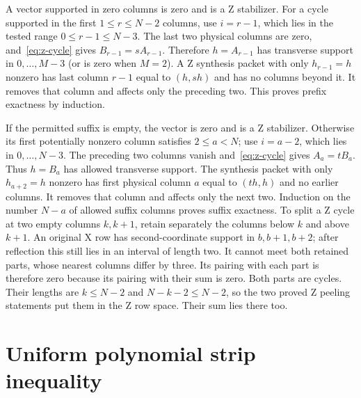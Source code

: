 \documentclass{article}
\begin{document}
A vector supported in zero columns is zero and is a Z stabilizer.
For a cycle supported in the first \(1\le r\le N-2\) columns, use \(i=r-1\),
which lies in the tested range \(0\le r-1\le N-3\).
The last two physical columns are zero, and~\eqref{eq:z-cycle} gives
\(B_{r-1}=sA_{r-1}\). Therefore \(h=A_{r-1}\) has transverse support in
\(0,\ldots,M-3\) (or is zero when \(M=2\)). A Z synthesis packet with
only \(h_{r-1}=h\) nonzero has last column \(r-1\) equal to \((h,sh)\)
and has no columns beyond it. It removes that column and affects only
the preceding two. This proves prefix exactness by induction.

If the permitted suffix is empty, the vector is zero and is a Z stabilizer.
Otherwise its first potentially nonzero column satisfies \(2\le a<N\);
use \(i=a-2\), which lies in \(0,\ldots,N-3\). The preceding two columns vanish and~\eqref{eq:z-cycle} gives
\(A_a=tB_a\). Thus \(h=B_a\) has allowed transverse support. The
synthesis packet with only \(h_{a+2}=h\) nonzero has first physical
column \(a\) equal to \((th,h)\) and no earlier columns. It removes that
column and affects only the next two. Induction on the number \(N-a\) of allowed suffix columns proves suffix exactness.
To split a Z cycle at two empty columns \(k,k+1\), retain separately the
columns below \(k\) and above \(k+1\). An original X row has second-coordinate
support in \(b,b+1,b+2\); after reflection this still lies in an interval
of length two. It cannot meet both retained parts, whose nearest columns
differ by three. Its pairing with each part is therefore zero because
its pairing with their sum is zero. Both parts are cycles. Their lengths
are \(k\le N-2\) and \(N-k-2\le N-2\), so the two proved Z peeling
statements put them in the Z row space. Their sum lies there too.

\section{Uniform polynomial strip inequality}\label{sec:main}
\end{document}
